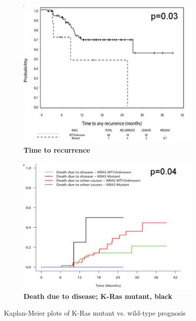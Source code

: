\documentclass[12pt]{article}
\begin{document}
  \begin{figure}[H]
  \centering
  \begin{subfigure}[b]{0.4\textwidth}
  \includegraphics[width=\textwidth]{kaplanmeier.png}
  \caption{\textbf{Time to recurrence}}
  \label{kaplanrecurrence}
  \end{subfigure}
  \begin{subfigure}[b]{0.4\textwidth}
  \includegraphics[width=\textwidth]{diseasedeath.png}
  \caption{\textbf{Death due to disease; K-Ras mutant, black}}
  \label{kplandeath}
  \end{subfigure}
  \caption{Kaplan-Meier plots of K-Ras mutant vs. wild-type prognosis \cite{mak2014}}
  \label{kraskaplan}
  \end{figure}
  
\end{document}
